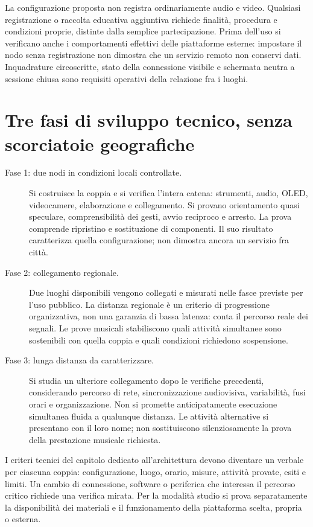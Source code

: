 La configurazione proposta non registra ordinariamente audio e video.
Qualsiasi registrazione o raccolta educativa aggiuntiva richiede finalità,
procedura e condizioni proprie, distinte dalla semplice partecipazione.
Prima dell'uso si verificano anche i comportamenti effettivi delle
piattaforme esterne: impostare il nodo senza registrazione non dimostra
che un servizio remoto non conservi dati. Inquadrature circoscritte,
stato della connessione visibile e schermata neutra a sessione chiusa
sono requisiti operativi della relazione fra i luoghi.

\section{Tre fasi di sviluppo tecnico, senza scorciatoie geografiche}
\begin{description}
\item[Fase 1: due nodi in condizioni locali controllate.]
Si costruisce la coppia e si verifica l'intera catena: strumenti, audio,
OLED, videocamere, elaborazione e collegamento. Si provano orientamento
quasi speculare, comprensibilità dei gesti, avvio reciproco e arresto.
La prova comprende ripristino e sostituzione di componenti. Il suo risultato
caratterizza quella configurazione; non dimostra ancora un servizio fra città.
\item[Fase 2: collegamento regionale.]
Due luoghi disponibili vengono collegati e misurati nelle fasce previste
per l'uso pubblico. La distanza regionale è un criterio di progressione
organizzativa, non una garanzia di bassa latenza: conta il percorso reale
dei segnali. Le prove musicali stabiliscono quali attività simultanee sono
sostenibili con quella coppia e quali condizioni richiedono sospensione.
\item[Fase 3: lunga distanza da caratterizzare.]
Si studia un ulteriore collegamento dopo le verifiche precedenti,
considerando percorso di rete, sincronizzazione audiovisiva, variabilità,
fusi orari e organizzazione. Non si promette anticipatamente esecuzione
simultanea fluida a qualunque distanza. Le attività alternative si
presentano con il loro nome; non sostituiscono silenziosamente la prova
della prestazione musicale richiesta.
\end{description}

I criteri tecnici del capitolo dedicato all'architettura devono diventare
un verbale per ciascuna coppia: configurazione, luogo, orario, misure,
attività provate, esiti e limiti. Un cambio di connessione, software o
periferica che interessa il percorso critico richiede una verifica mirata.
Per la modalità studio si prova separatamente la disponibilità dei
materiali e il funzionamento della piattaforma scelta, propria o esterna.

